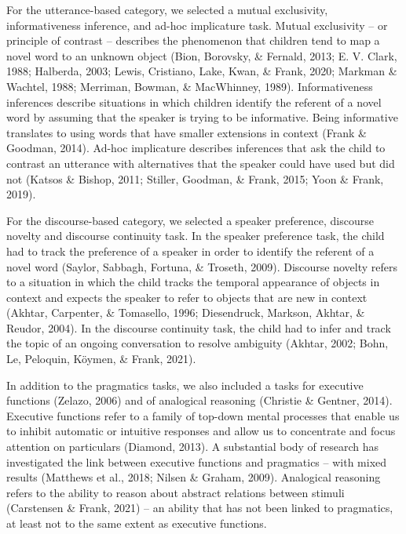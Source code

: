 \documentclass[
  english,
  man,floatsintext]{apa6}
\begin{document}
For the utterance-based category, we selected a mutual exclusivity, informativeness inference, and ad-hoc implicature task. Mutual exclusivity -- or principle of contrast -- describes the phenomenon that children tend to map a novel word to an unknown object (Bion, Borovsky, \& Fernald, 2013; E. V. Clark, 1988; Halberda, 2003; Lewis, Cristiano, Lake, Kwan, \& Frank, 2020; Markman \& Wachtel, 1988; Merriman, Bowman, \& MacWhinney, 1989). Informativeness inferences describe situations in which children identify the referent of a novel word by assuming that the speaker is trying to be informative. Being informative translates to using words that have smaller extensions in context (Frank \& Goodman, 2014). Ad-hoc implicature describes inferences that ask the child to contrast an utterance with alternatives that the speaker could have used but did not (Katsos \& Bishop, 2011; Stiller, Goodman, \& Frank, 2015; Yoon \& Frank, 2019).

For the discourse-based category, we selected a speaker preference, discourse novelty and discourse continuity task. In the speaker preference task, the child had to track the preference of a speaker in order to identify the referent of a novel word (Saylor, Sabbagh, Fortuna, \& Troseth, 2009). Discourse novelty refers to a situation in which the child tracks the temporal appearance of objects in context and expects the speaker to refer to objects that are new in context (Akhtar, Carpenter, \& Tomasello, 1996; Diesendruck, Markson, Akhtar, \& Reudor, 2004). In the discourse continuity task, the child had to infer and track the topic of an ongoing conversation to resolve ambiguity (Akhtar, 2002; Bohn, Le, Peloquin, Köymen, \& Frank, 2021).

In addition to the pragmatics tasks, we also included a tasks for executive functions (Zelazo, 2006) and of analogical reasoning (Christie \& Gentner, 2014). Executive functions refer to a family of top-down mental processes that enable us to inhibit automatic or intuitive responses and allow us to concentrate and focus attention on particulars (Diamond, 2013). A substantial body of research has investigated the link between executive functions and pragmatics -- with mixed results (Matthews et al., 2018; Nilsen \& Graham, 2009). Analogical reasoning refers to the ability to reason about abstract relations between stimuli (Carstensen \& Frank, 2021) -- an ability that has not been linked to pragmatics, at least not to the same extent as executive functions.
\end{document}
